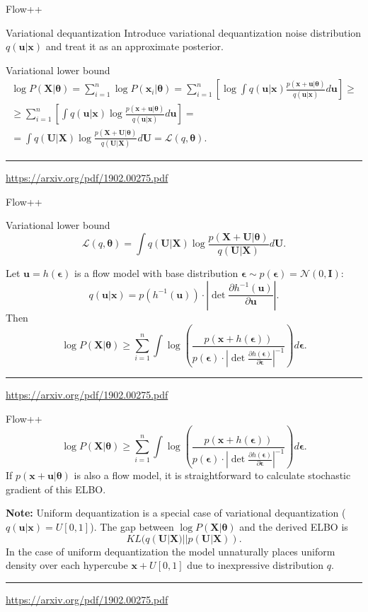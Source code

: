 \documentclass{beamer}
\newcommand{\bu}{\mathbf{u}}
\newcommand{\bx}{\mathbf{x}}
\newcommand{\bU}{\mathbf{U}}
\newcommand{\bX}{\mathbf{X}}
\newcommand{\bepsilon}{\boldsymbol{\epsilon}}
\newcommand{\btheta}{\boldsymbol{\theta}}
\begin{document}
\begin{frame}{Flow++}
	\begin{block}{Variational dequantization}
		Introduce variational dequantization noise distribution $q(\bu | \bx)$ and treat it as an approximate posterior. 
	\end{block}
	\begin{block}{Variational lower bound}
		\begin{multline*}
			\log P(\bX | \btheta) = \sum_{i=1}^n \log P(\bx_i | \btheta) = \sum_{i=1}^n \left[ \log \int q(\bu | \bx) \frac{p(\bx + \bu | \btheta)}{q(\bu | \bx)} d \bu \right] \geq \\ 
			\geq\sum_{i=1}^n \left[  \int q(\bu | \bx) \log \frac{p(\bx + \bu | \btheta)}{q(\bu | \bx)} d \bu \right] = \\ = \int q(\bU | \bX) \log \frac{p(\bX + \bU | \btheta)}{q(\bU | \bX)} d \bU = \mathcal{L}(q, \btheta).
		\end{multline*}
	\end{block}
	\hrule\medskip
	{\scriptsize \href{https://arxiv.org/pdf/1902.00275.pdf}{https://arxiv.org/pdf/1902.00275.pdf}}
\end{frame}
\begin{frame}{Flow++}
	\begin{block}{Variational lower bound}
		\[
		\mathcal{L}(q, \btheta) = \int q(\bU | \bX) \log \frac{p(\bX + \bU | \btheta)}{q(\bU | \bX)} d \bU.
		\]
	\end{block}
	Let $\bu = h(\bepsilon)$ is a flow model with base distribution $\bepsilon \sim p(\bepsilon) = \mathcal{N}(0, \mathbf{I})$:
	\[
		q(\bu | \bx) = p(h^{-1}(\bu)) \cdot \left| \det \frac{\partial h^{-1}(\bu)}{\partial \bu}\right|.
	\]
	Then
	\[
		\log P(\bX | \btheta) \geq \sum_{i=1}^n \int \log \left( \frac{p(\bx + h(\bepsilon))}{p(\bepsilon) \cdot \left| \det \frac{\partial h(\bepsilon)}{\partial \bepsilon}\right|^{-1}} \right) d\bepsilon.
	\]
	\hrule\medskip
	{\scriptsize \href{https://arxiv.org/pdf/1902.00275.pdf}{https://arxiv.org/pdf/1902.00275.pdf}}
\end{frame}
\begin{frame}{Flow++}
	\[
		\log P(\bX | \btheta) \geq \sum_{i=1}^n \int \log \left( \frac{p(\bx + h(\bepsilon))}{p(\bepsilon) \cdot \left| \det \frac{\partial h(\bepsilon)}{\partial \bepsilon}\right|^{-1}} \right) d\bepsilon.
	\]
	If $p(\bx + \bu | \btheta)$ is also a flow model, it is straightforward to calculate stochastic gradient of this ELBO.
	
	\textbf{Note:} Uniform dequantization is a special case of variational dequantization ($q(\bu | \bx) = U[0, 1]$).
	The gap between $\log P(\bX | \btheta)$ and the derived ELBO is 
	\[
		KL(q(\bU | \bX) || p(\bU | \bX)).
	\]
	In the case of uniform dequantization the model unnaturally places uniform density over each hypercube $\bx + U[0, 1]$ due to inexpressive distribution $q$.
	\vfill
	\hrule\medskip
	{\scriptsize \href{https://arxiv.org/pdf/1902.00275.pdf}{https://arxiv.org/pdf/1902.00275.pdf}}
\end{frame}
\end{document}
